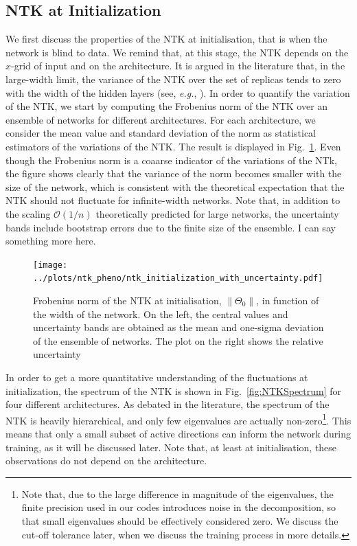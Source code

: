 \subsection{NTK at Initialization}
\label{sec:NTKAtInit}
We first discuss the properties of the NTK at initialisation, that is when the
network is blind to data. We remind that, at this stage, the NTK depends on the
$x$-grid of input and on the architecture. It is argued in the literature that,
in the large-width limit, the variance of the NTK over the set of replicas tends to zero 
with the width of the hidden layers (see, \textit{e.g.}, \cite{Roberts:2021fes}). In order to
quantify the variation of the NTK, we start by computing the Frobenius norm of the NTK over
an ensemble of networks for different architectures. For each architecture, we
consider the mean value and standard deviation of the norm as statistical estimators of the
variations of the NTK. The result is displayed in Fig.~\ref{fig:NTKInit}. Even though the 
Frobenius norm is a coaarse indicator of the variations of the NTk,
the figure shows clearly that the variance of the norm becomes smaller with the size of the
network, which is consistent with the theoretical expectation that the NTK should not 
fluctuate for infinite-width networks. Note that, in addition to the scaling $\mathcal{O}(1/n)$ theoretically
predicted for large networks, the uncertainty bands include bootstrap errors
due to the finite size of the ensemble. \ac{I can say something more here.}

\begin{figure}[ht!]
  \centering
  \texttt{[image: ../plots/ntk\_pheno/ntk\_initialization\_with\_uncertainty.pdf]}
  \caption{Frobenius norm of the NTK at initialisation, $\lVert \Theta_0
  \rVert$, in function of the width of the network. On the left, the central values
  and uncertainty bands are obtained as the mean and one-sigma deviation of the
  ensemble of networks. The plot on the right shows the relative uncertainty }
  \label{fig:NTKInit}
\end{figure}

In order to get a more quantitative understanding of the fluctuations 
at initialization, the spectrum of the NTK is shown in Fig.~\ref{fig:NTKSpectrum} for four different architectures. 
As debated in the
literature, the spectrum of the NTK is heavily hierarchical, and only few
eigenvalues are actually non-zero\footnote{Note that, due to the large
difference in magnitude of the eigenvalues, the finite precision used in our
codes introduces noise in the decomposition, so that small eigenvalues
should be effectively considered zero. We discuss the cut-off tolerance
later, when we discuss the training process in more details.}. This means that
only a small subset of active directions can inform the network during training,
as it will be discussed later. Note that, at least at initialisation, these
observations do not depend on the architecture.

